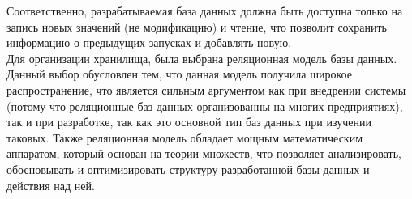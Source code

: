Соответственно, разрабатываемая база данных должна быть доступна только на запись новых значений (не модификацию) и чтение, что позволит сохранить информацию о предыдущих запусках и добавлять новую.\\
\indent Для организации хранилища, была выбрана реляционная модель базы данных.
Данный выбор обусловлен тем, что данная модель получила широкое распространение, что является сильным аргументом как при внедрении системы (потому что реляционные баз данных организованны на многих предприятиях), так и при разработке, так как это основной тип баз данных при изучении таковых.
Также реляционная модель обладает мощным математическим аппаратом, который основан на теории множеств, что позволяет анализировать, обосновывать и оптимизировать структуру разработанной базы данных и действия над ней.



